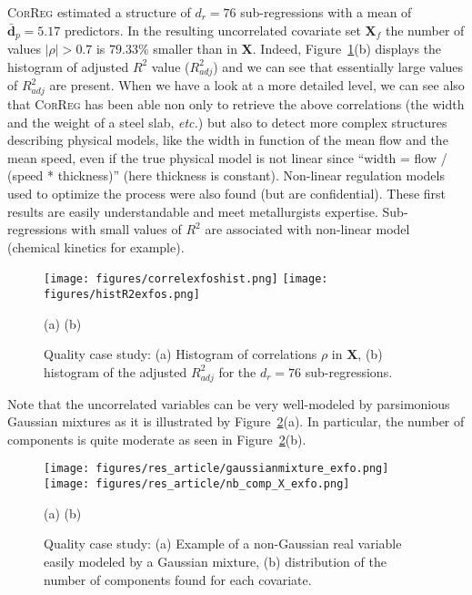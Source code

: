 \documentclass[11pt,a4paper]{article}
\begin{document}
\textsc{CorReg} estimated a structure of $d_r=76$ sub-regressions with a mean of $\bar{\boldsymbol{d}}_p=5.17$ predictors. In the resulting uncorrelated covariate set $\boldsymbol{X}_f$ the number of values $|\rho|>0.7$ is $79.33\%$ smaller than in $\boldsymbol{X}$. Indeed, Figure~\ref{fig:graphCorr.quality}(b) displays the histogram of adjusted $R^2$ value ($R^2_{adj}$) and we can see that essentially large values of $R^2_{adj}$ are present. When we have a look at a more detailed level, we can see also that \textsc{CorReg} has been able non only to retrieve the above correlations (the width and the weight of a steel slab, {\it etc.}) but also to detect more complex structures describing physical models, like the width in function of the mean flow and the mean speed, even if the true physical model is not linear since ``width = flow / (speed * thickness)'' (here thickness is constant). Non-linear regulation models used to optimize the process were also found (but are confidential). These first results are easily understandable and meet metallurgists expertise.  Sub-regressions with small values of $R^2$ are associated with non-linear model (chemical kinetics for example).
		
\begin{figure}[h!]
\begin{center}
			\texttt{[image: figures/correlexfoshist.png]}
			\texttt{[image: figures/histR2exfos.png]}
\end{center}
\vspace{-5mm}
			\centerline{(a) \hspace{130px} (b)}
			\caption{Quality case study: (a) Histogram of correlations $\rho$ in $\boldsymbol{X}$, (b) histogram of the adjusted $R^2_{adj}$ for the $d_r=76$ sub-regressions.}\label{fig:graphCorr.quality}
\end{figure}  			
		
\vspace{3mm}

Note that the uncorrelated variables can be very well-modeled by parsimonious Gaussian mixtures as it is illustrated by Figure~\ref{fig:graphMixmod.quality}(a). In particular, the number of components is quite moderate as seen in Figure~\ref{fig:graphMixmod.quality}(b).
		
		\begin{figure}[h!]
\begin{center}
			\texttt{[image: figures/res\_article/gaussianmixture\_exfo.png]}
			\texttt{[image: figures/res\_article/nb\_comp\_X\_exfo.png]}
\end{center}
\vspace{-5mm}
			\centerline{(a) \hspace{130px} (b)}
			\caption{Quality case study: (a) Example of a non-Gaussian real variable easily modeled by a Gaussian mixture, (b) distribution of the number of components found for each covariate.}\label{fig:graphMixmod.quality}
\end{figure}  	
\end{document}
